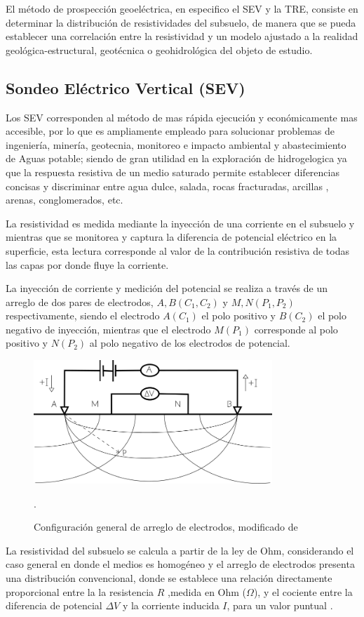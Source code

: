 			El método de prospección geoeléctrica, en especifico el SEV y la TRE, consiste en determinar la distribución de resistividades del subsuelo, de manera que se pueda establecer una correlación entre la resistividad y un modelo ajustado a la realidad geológica-estructural, geotécnica o geohidrológica del objeto de estudio.
	
		\subsection{Sondeo Eléctrico Vertical (SEV)}
			
			Los SEV corresponden al método de mas rápida ejecución y económicamente mas accesible, por lo que es ampliamente empleado para solucionar problemas de ingeniería, minería, geotecnia, monitoreo e impacto ambiental y abastecimiento de Aguas potable; siendo de gran utilidad en la exploración de hidrogelogica ya que la respuesta resistiva de un medio saturado permite establecer diferencias concisas y discriminar entre agua dulce, salada, rocas fracturadas, arcillas , arenas, conglomerados, etc.
			
			La resistividad es medida mediante la inyección de una corriente en el subsuelo y mientras que se monitorea y captura la diferencia de potencial eléctrico en la superficie, esta lectura corresponde al valor de la contribución resistiva de todas las capas por donde fluye la corriente.
			
			La inyección de corriente y medición del potencial se realiza a través de un arreglo de dos pares de electrodos, $A, B (C_{1}, C_{2})$ y $M, N (P_{1}, P_{2}) $ respectivamente, siendo el electrodo $A (C_{1})$ el polo positivo y $B (C_{2})$ el polo negativo de inyección, mientras que el electrodo $M (P_{1})$ corresponde al polo positivo y $N (P_{2})$ al polo negativo de los electrodos de potencial.\\
			 
			\begin{figure}[h!]
				\centering
				\includegraphics[width=9cm]{Imagenes/ArregloElectrodos}
				\caption[Configuración general de electrodos]{Configuración general de arreglo de electrodos, modificado de \citet{reynolds2011}}.
				\label{fig:AE}
			\end{figure}
			La resistividad del subsuelo se calcula a partir de la ley de Ohm, considerando el caso general en donde el medios es homogéneo y el arreglo de electrodos presenta una distribución convencional, donde se establece una relación directamente proporcional entre la la resistencia $R$ ,medida en Ohm ($\Omega$), y el cociente entre la diferencia de potencial $\Delta V$ y la corriente inducida $I$, para un valor puntual \citep{igboama2023}.
			
